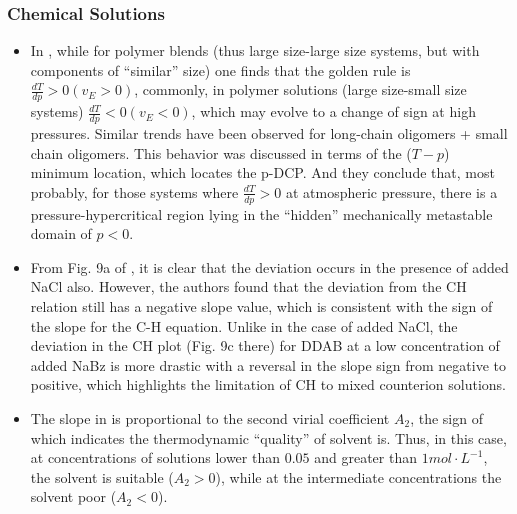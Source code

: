\documentclass[11pt]{book}
\begin{document}
\subsubsection{Chemical Solutions}
\begin{itemize}
\item In \cite{rebelo2002double},
while for polymer blends (thus large size-large size systems, but
with components of \textquotedblleft similar\textquotedblright{} size)
one finds that the golden rule is $\frac{dT}{dp}>0\left(v_{E}>0\right)$,
commonly, in polymer solutions (large size-small size systems) $\frac{dT}{dp}<0\left(v_{E}<0\right)$,
which may evolve to a change of sign at high pressures. Similar trends
have been observed for long-chain oligomers + small chain oligomers.
This behavior was discussed in terms of the ($T-p$) minimum location,
which locates the p-DCP. And they conclude that, most probably, for
those systems where $\frac{dT}{dp}>0$ at atmospheric pressure, there
is a pressure-hypercritical region lying in the \textquotedblleft hidden\textquotedblright{}
mechanically metastable domain of $p<0$.
\item From Fig. 9a of \cite{thapa2020studies},
it is clear that the deviation occurs in the presence of added NaCl
also. However, the authors found that the deviation from the CH relation
still has a negative slope value, which is consistent with the sign
of the slope for the C-H equation. Unlike in the case of added NaCl,
the deviation in the CH plot (Fig. 9c there) for DDAB at a low concentration
of added NaBz is more drastic with a reversal in the slope sign from
negative to positive, which highlights the limitation of CH to mixed
counterion solutions.
\item The slope in \cite{orlovapolarimetry}
is proportional to the second virial coefficient $A_{2}$,
the sign of which indicates the thermodynamic \textquotedblleft quality\textquotedblright{}
of solvent is. Thus, in this case, at concentrations of solutions
lower than $0.05$ and greater than $1mol\cdot L^{-1}$,
the solvent is suitable ($A_{2}>0$), while
at the intermediate concentrations the solvent poor ($A_{2}<0$).
\end{itemize}
\end{document}
